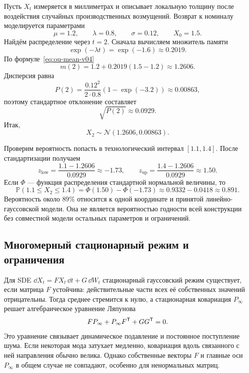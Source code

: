Пусть $X_t$ измеряется в миллиметрах и описывает локальную толщину после воздействия случайных производственных возмущений. Возврат к номиналу моделируется параметрами
\begin{equation}
\label{eq:ou-worked-data-v04}
\mu=1.2,
\qquad
\lambda=0.8,
\qquad
\sigma=0.12,
\qquad
X_0=1.5.
\end{equation}
Найдём распределение через $t=2$. Сначала вычисляем множитель памяти
\[
\exp(-\lambda t)
=
\exp(-1.6)
\approx0.2019.
\]
По формуле~\eqref{eq:ou-mean-v04}
\begin{equation}
\label{eq:ou-worked-mean-v04}
m(2)
=
1.2+0.2019(1.5-1.2)
\approx1.2606.
\end{equation}
Дисперсия равна
\begin{equation}
\label{eq:ou-worked-variance-v04}
P(2)
=
\frac{0.12^2}{2\cdot0.8}
\left(1-\exp(-3.2)\right)
\approx0.00863,
\end{equation}
поэтому стандартное отклонение составляет
\[
\sqrt{P(2)}\approx0.0929.
\]
Итак,
\begin{equation}
\label{eq:ou-worked-law-v04}
X_2\sim\mathcal N(1.2606,0.00863).
\end{equation}

Проверим вероятность попасть в технологический интервал $[1.1,1.4]$. После стандартизации получаем
\[
z_{\mathrm{low}}
=
\frac{1.1-1.2606}{0.0929}
\approx-1.73,
\qquad
z_{\mathrm{up}}
=
\frac{1.4-1.2606}{0.0929}
\approx1.50.
\]
Если $\Phi$ --- функция распределения стандартной нормальной величины, то
\begin{equation}
\label{eq:ou-worked-probability-v04}
\mathbb P(1.1\leq X_2\leq1.4)
=
\Phi(1.50)-\Phi(-1.73)
\approx0.9332-0.0418
\approx0.891.
\end{equation}
Вероятность около $89\%$ относится к одной координате и принятой линейно-гауссовской модели. Она не является вероятностью годности всей конструкции без совместной модели остальных параметров и ограничений.

\subsection{Многомерный стационарный режим и ограничения}

Для SDE $\dd X_t=FX_t\,\dd t+G\,\dd W_t$ стационарный гауссовский режим существует, если матрица $F$ устойчива: действительные части всех её собственных значений отрицательны. Тогда среднее стремится к нулю, а стационарная ковариация $P_{\infty}$ решает алгебраическое уравнение Ляпунова
\begin{equation}
\label{eq:continuous-lyapunov-v04}
FP_{\infty}
+
P_{\infty}F^{\mathsf{T}}
+
GG^{\mathsf{T}}
=0.
\end{equation}
Это уравнение связывает динамическое подавление и постоянное поступление шума. Если некоторая мода затухает медленно, ковариация вдоль связанного с ней направления обычно велика. Однако собственные векторы $F$ и главные оси $P_{\infty}$ в общем случае не совпадают, особенно для ненормальных матриц.

